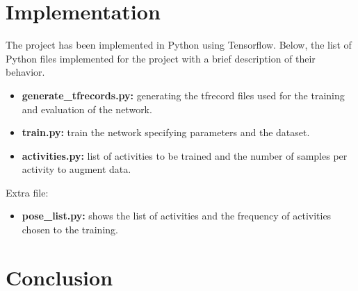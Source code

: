 \documentclass{article}
\begin{document}

\section{Implementation}

The project has been implemented in Python using Tensorflow. Below, the list of Python files implemented for the project with a brief description of their behavior.

\begin{itemize}
    \item \textbf{generate\_tfrecords.py:} generating the tfrecord files used for the training and evaluation of the network.
    \item \textbf{train.py:} train the network specifying parameters and the dataset.
    \item \textbf{activities.py:} list of activities to be trained and the number of samples per activity to augment data.
\end{itemize}

Extra file:

\begin{itemize}
    \item \textbf{pose\_list.py:} shows the list of activities and the frequency of activities chosen to the training.
\end{itemize}


\section{Conclusion}



\clearpage



\end{document}

